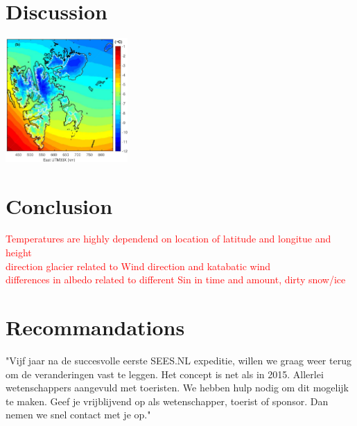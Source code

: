 \documentclass[11pt]{report}
\begin{document}
\chapter{Discussion}\label{sec:discussion}
\includegraphics[scale=1, width=0.35\textwidth]{ostby.jpg}
\cite{osby}





\chapter{Conclusion}\label{sec:conclusion}

\textcolor{red}{
Temperatures are highly dependend on location of latitude and longitue and height\\
direction glacier related to Wind direction and katabatic wind\\
differences in albedo related to different Sin in time and amount, dirty snow/ice}

\chapter{Recommandations}\label{sec:rec}
"Vijf jaar na de succesvolle eerste SEES.NL expeditie, willen we graag weer terug om de veranderingen vast te leggen. Het concept is net als in 2015. Allerlei wetenschappers aangevuld met toeristen. We hebben hulp nodig om dit mogelijk te maken. Geef je vrijblijvend op als wetenschapper, toerist of sponsor. Dan nemen we snel contact met je op."
\medskip
\end{document}
